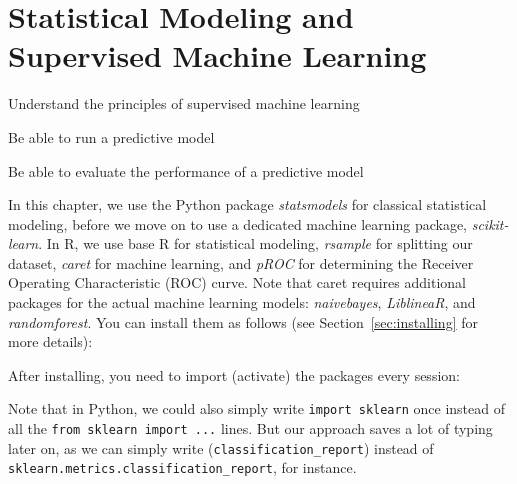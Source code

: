 \chapter{Statistical Modeling and Supervised Machine Learning}
\label{chap:introsml}

\begin{abstract}{Abstract} This chapter introduces the reader to the world of supervised machine learning. It starts by outlining how classical statistical techniques such as regression models can be used for prediction. It then provides an overview of frequently-used techniques from Na\"ive Bayes classifiers to neural networks.
\end{abstract}



\begin{objectives}
\item Understand the principles of supervised machine learning
\item Be able to run a predictive model
\item Be able to evaluate the performance of a predictive model
\end{objectives}

\newpage
\begin{feature}

In this chapter, we use the Python package \emph{statsmodels} for classical statistical modeling, before we move on to use a dedicated machine learning package, \emph{scikit-learn}. In R, we use base R for statistical modeling, \emph{rsample} for splitting our dataset, \emph{caret} for machine learning, and \emph{pROC} for determining the Receiver Operating Characteristic (ROC) curve. Note that caret requires additional packages for the actual machine learning models: \emph{naivebayes}, \emph{LiblineaR}, and \emph{randomforest}. You can install them as follows (see Section~\ref{sec:installing} for more details):


\noindent After installing, you need to import (activate) the packages every session:


Note that in Python, we could also simply write \texttt{\small{import sklearn}} once instead of all the \texttt{\small{from sklearn import ...}} lines. But our approach saves a lot of typing later on, as we can simply write (\texttt{\small{classification\_report}}) instead of \texttt{\small{sklearn.metrics.classification\_report}}, for instance.
\end{feature}





